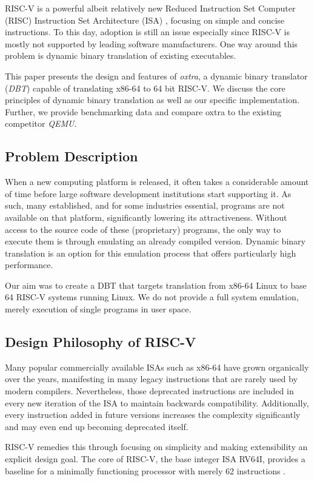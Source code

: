 RISC-V is a powerful albeit relatively new Reduced Instruction Set Computer (RISC) Instruction Set Architecture (ISA) \cite{riscvisa}, focusing on simple and concise instructions. To this day, adoption is still an issue especially since RISC-V is mostly not supported by leading software manufacturers. One way around this problem is dynamic binary translation of existing executables.

This paper presents the design and features of \emph{oxtra}, a dynamic binary translator (\emph{DBT}) capable of translating x86-64 to 64 bit RISC-V. We discuss the core principles of dynamic binary translation as well as our specific implementation. Further, we provide benchmarking data and compare oxtra to the existing competitor \emph{QEMU}.

\subsection{Problem Description}
When a new computing platform is released, it often takes a considerable amount of time before large software development institutions start supporting it. As such, many established, and for some industries essential, programs are not available on that platform, significantly lowering its attractiveness. Without access to the source code of these (proprietary) programs, the only way to execute them is through emulating an already compiled version. Dynamic binary translation is an option for this emulation process that offers particularly high performance.

Our aim was to create a DBT that targets translation from x86-64 Linux to base 64 RISC-V systems running Linux. We do not provide a full system emulation, merely execution of single programs in user space.

\subsection{Design Philosophy of RISC-V}
Many popular commercially available ISAs such as x86-64 have grown organically over the years, manifesting in many legacy instructions that are rarely used by modern compilers. Nevertheless, those deprecated instructions are included in every new iteration of the ISA to maintain backwards compatibility. Additionally, every instruction added in future versions increases the complexity significantly and may even end up becoming deprecated itself.

RISC-V remedies this through focusing on simplicity and making extensibility an explicit design goal. The core of RISC-V, the base integer ISA RV64I, provides a baseline for a minimally functioning processor with merely 62 instructions \cite{riscvisa}.

